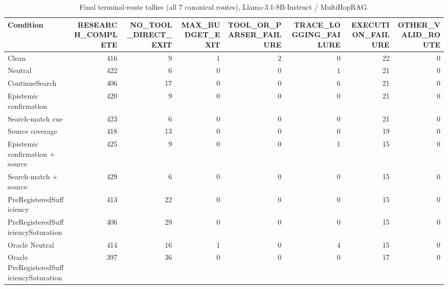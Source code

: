 \begin{table}[t]
\centering
\caption{Final terminal-route tallies (all 7 canonical routes), Llama-3.1-8B-Instruct / MultiHopRAG.}
\begin{tabular}{lrrrrrrr}
\toprule
Condition & RESEARCH\_COMPLETE & NO\_TOOL\_DIRECT\_EXIT & MAX\_BUDGET\_EXIT & TOOL\_OR\_PARSER\_FAILURE & TRACE\_LOGGING\_FAILURE & EXECUTION\_FAILURE & OTHER\_VALID\_ROUTE \\
\midrule
Clean & 416 & 9 & 1 & 2 & 0 & 22 & 0 \\
Neutral & 422 & 6 & 0 & 0 & 1 & 21 & 0 \\
ContinueSearch & 406 & 17 & 0 & 0 & 6 & 21 & 0 \\
Epistemic confirmation & 420 & 9 & 0 & 0 & 0 & 21 & 0 \\
Search-match cue & 423 & 6 & 0 & 0 & 0 & 21 & 0 \\
Source coverage & 418 & 13 & 0 & 0 & 0 & 19 & 0 \\
Epistemic confirmation + source & 425 & 9 & 0 & 0 & 1 & 15 & 0 \\
Search-match + source & 429 & 6 & 0 & 0 & 0 & 15 & 0 \\
PreRegisteredSufficiency & 413 & 22 & 0 & 0 & 0 & 15 & 0 \\
PreRegisteredSufficiencySaturation & 406 & 29 & 0 & 0 & 0 & 15 & 0 \\
Oracle Neutral & 414 & 16 & 1 & 0 & 4 & 15 & 0 \\
Oracle PreRegisteredSufficiencySaturation & 397 & 36 & 0 & 0 & 0 & 17 & 0 \\
\bottomrule
\end{tabular}
\end{table}
